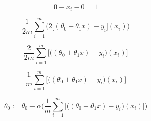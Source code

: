 \documentclass[12pt,journal]{IEEEtran}
\begin{document}
    \begin{equation}
    0 + x_i - 0 = 1
    \end{equation}

    \begin{equation}
        \frac{1}{2m} \sum_{i=1}^{m} \bigg( 2 \Big[ (\theta_0 + \theta_1 x) - y_i \Big] ( x_i ) \bigg)
    \end{equation}

    \begin{equation}
        \frac{2}{2m} \sum_{i=1}^{m} \bigg[ \Big( (\theta_0 + \theta_1 x) - y_i \Big) ( x_i ) \bigg]
    \end{equation}

    \begin{equation}
        \frac{1}{m} \sum_{i=1}^{m} \bigg[ \Big( (\theta_0 + \theta_1 x) - y_i \Big) ( x_i ) \bigg]
    \end{equation}

    \begin{equation}
        \theta_0 := \theta_0 - \alpha \Bigg( \frac{1}{m} \sum_{i=1}^{m} \bigg[ \Big( (\theta_0 + \theta_1 x) - y_i \Big) ( x_i ) \bigg] \Bigg)
    \end{equation}
\end{document}
